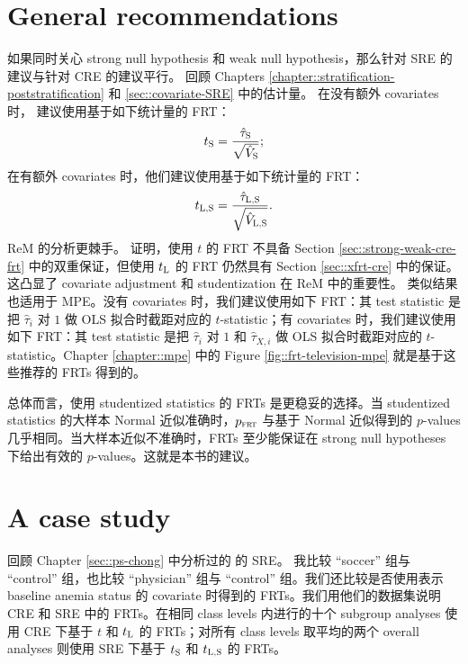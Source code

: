 \section{General recommendations}
如果同时关心 strong null hypothesis 和 weak null hypothesis，那么针对 SRE 的建议与针对 CRE 的建议平行。
回顾 Chapters \ref{chapter::stratification-poststratification} 和 \ref{sec::covariate-SRE} 中的估计量。
在没有额外 covariates 时，\citet{zhao2020caFRT} 建议使用基于如下统计量的 FRT：
$$
t_\textsc{S} =  \frac{  \hat{\tau}_\textsc{S} }{  \sqrt{\hat{V}_\textsc{S}} } ;
$$ 
在有额外 covariates 时，他们建议使用基于如下统计量的 FRT：
$$
t_\textsc{L,S} =  \frac{  \hat{\tau}_\textsc{L,S} }{  \sqrt{\hat{V}_\textsc{L,S}} } . 
$$ 
ReM 的分析更棘手。\citet{zhao2020caFRT} 证明，使用 $t$ 的 FRT 不具备 Section \ref{sec::strong-weak-cre-frt} 中的双重保证，但使用 $t_\textsc{L}$ 的 FRT 仍然具有 Section \ref{sec::xfrt-cre} 中的保证。这凸显了 covariate adjustment 和 studentization 在 ReM 中的重要性。
类似结果也适用于 MPE。没有 covariates 时，我们建议使用如下 FRT：其 test statistic 是把 $\hat\tau_i$ 对 $1$ 做 OLS 拟合时截距对应的 $t$-statistic；有 covariates 时，我们建议使用如下 FRT：其 test statistic 是把 $\hat\tau_i$ 对 $1$ 和 $\hat\tau_{X,i}$ 做 OLS 拟合时截距对应的 $t$-statistic。Chapter \ref{chapter::mpe} 中的 Figure \ref{fig::frt-television-mpe} 就是基于这些推荐的 FRTs 得到的。

总体而言，使用 studentized statistics 的 FRTs 是更稳妥的选择。当 studentized statistics 的大样本 Normal 近似准确时，$p_{\textsc{frt}}$ 与基于 Normal 近似得到的 $p$-values 几乎相同。当大样本近似不准确时，FRTs 至少能保证在 strong null hypotheses 下给出有效的 $p$-values。这就是本书的建议。

\section{A case study}
\label{sec::case-study-chong}

 

回顾 Chapter \ref{sec::ps-chong} 中分析过的 \citet{chong2016iron} 的 SRE。
我比较 ``soccer'' 组与 ``control'' 组，也比较 ``physician'' 组与 ``control'' 组。我们还比较是否使用表示 baseline anemia status 的 covariate 时得到的 FRTs。我们用他们的数据集说明 CRE 和 SRE 中的 FRTs。在相同 class levels 内进行的十个 subgroup analyses 使用 CRE 下基于 $t$ 和 $t_\textsc{L}$ 的 FRTs；对所有 class levels 取平均的两个 overall analyses 则使用 SRE 下基于 $t_\textsc{S}$ 和 $t_\textsc{L,S}$ 的 FRTs。

